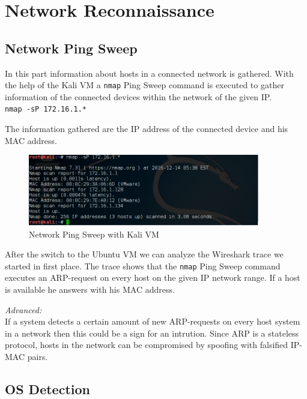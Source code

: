 \thispagestyle{standard}
\pagestyle{standard}
\chapter{Network Reconnaissance}

\section{Network Ping Sweep}

In this part information about hosts in a connected network is gathered.
With the help of the Kali VM a \texttt{nmap} Ping Sweep command is executed to gather information of the connected devices within the network of the given IP.\\
\texttt{nmap -sP 172.16.1.*}

The information gathered are the IP address of the connected device and his MAC address.

\begin{figure}[H]
	\centering
	\includegraphics[width=0.9\textwidth]{img/2_1_Network_Ping_Sweep_Kali.PNG}
	\caption{Network Ping Sweep with Kali VM}
	\label{img:network ping sweep}
\end{figure}

After the switch to the Ubuntu VM we can analyze the Wireshark trace we started in first place. The trace shows that the \texttt{nmap} Ping Sweep command executes an \ac{ARP}-request on every host on the given IP network range. If a host is available he answers with his MAC address.

\textit{Advanced:}\\
If a system detects a certain amount of new \ac{ARP}-requests on every host system in a network then this could be a sign for an intrution. Since \ac{ARP} is a stateless protocol, hosts in the network can be compromised by spoofing with falsified IP-MAC pairs.

\section{OS Detection}

